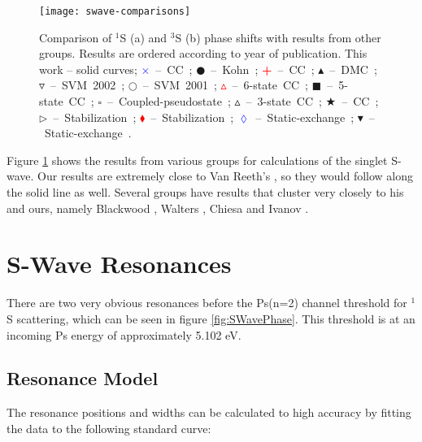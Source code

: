 \documentclass[Dissertation.tex]{subfiles}
\begin{document}
\begin{figure}[H]
	\centering
	\texttt{[image: swave-comparisons]}
	\caption[Comparison of S-wave phase shifts]{Comparison of $^1$S (a) and $^3$S (b) phase shifts with results from other groups. Results are ordered according to year of publication. This work -- solid curves; \mbox{\textcolor{blue}{$\times$} -- CC \cite{Walters2004};} \mbox{$\CIRCLE$ -- Kohn \cite{VanReeth2003};} \mbox{\textcolor{red}{\textbf{+}} -- CC \cite{Blackwood2002};} \mbox{$\blacktriangle$ -- DMC \cite{Chiesa2002};} \mbox{$\triangledown$ -- SVM 2002 \cite{Ivanov2002};} \mbox{$\Circle$ -- SVM 2001 \cite{Ivanov2001};} \mbox{\textcolor{red}{$\vartriangle$} -- 6-state CC \cite{Sinha2000};} \mbox{$\blacksquare$ -- 5-state CC \cite{Adhikari1999};} \mbox{$\square$ -- Coupled-pseudostate \cite{Campbell1998};} \mbox{$\vartriangle$ -- 3-state CC \cite{Sinha1997};} \mbox{\textcolor[RGB]{0,127,0}{$\bigstar$} -- CC \cite{Ray1997};} \mbox{$\triangleright$ -- Stabilization \cite{Drachman1976};} \mbox{\textcolor{red}{$\blacklozenge$} -- Stabilization \cite{Drachman1975};} \mbox{\textcolor{blue}{$\lozenge$} -- Static-exchange \cite{Hara1975};} \mbox{$\blacktriangledown$ -- Static-exchange \cite{Fraser1961}.}}
	\label{fig:SWaveComparisons}
\end{figure}

Figure \ref{fig:SWaveComparisons} shows the results from various groups for calculations of the singlet S-wave.  Our results are extremely close to Van Reeth's \cite{VanReeth2003}, so they would follow along the solid line as well.  Several groups have results that cluster very closely to his and ours, namely Blackwood \cite{Blackwood2002}, Walters \cite{Walters2004}, Chiesa \cite{Chiesa2002} and Ivanov \cite{Ivanov2002}.






\section{S-Wave Resonances}
\label{sec:SWaveResonances}

There are two very obvious resonances before the Ps(n=2) channel threshold for $^1$S scattering, which can be seen in figure \ref{fig:SWavePhase}.  This threshold is at an incoming Ps energy of approximately 5.102 eV.  

\subsection{Resonance Model}
\label{sec:ResonanceModel}
The resonance positions and widths can be calculated to high accuracy by fitting the data to the following standard curve:
\end{document}
